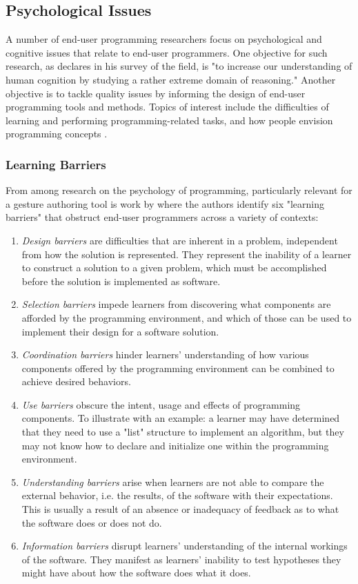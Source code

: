 \subsection{Psychological Issues}

A number of end-user programming researchers focus on psychological and cognitive issues that relate to end-user programmers. One objective for such research, as \textcite{Blackwell:2006} declares in his survey of the field, is "to increase our understanding of human cognition by studying a rather extreme domain of reasoning." Another objective is to tackle quality issues by informing the design of end-user programming tools and methods. Topics of interest include the difficulties of learning \parencite{Ko:2004, Pea:1987} and performing \parencite{Lewis:1987} programming-related tasks, and how people envision programming concepts \parencite{Pane:2001}.

\subsubsection{Learning Barriers}

From among research on the psychology of programming, particularly relevant for a gesture authoring tool is work by \textcite{Ko:2004} where the authors identify six "learning barriers" that obstruct end-user programmers across a variety of contexts:

\begin{enumerate}
\item \emph{Design barriers} are difficulties that are inherent in a problem, independent from how the solution is represented. They represent the inability of a learner to construct a solution to a given problem, which must be accomplished before the solution is implemented as software.
\item \emph{Selection barriers} impede learners from discovering what components are afforded by the programming environment, and which of those can be used to implement their design for a software solution.
\item \emph{Coordination barriers} hinder learners' understanding of how various components offered by the programming environment can be combined to achieve desired behaviors.
\item \emph{Use barriers} obscure the intent, usage and effects of programming components. To illustrate with an example: a learner may have determined that they need to use a "list" structure to implement an algorithm, but they may not know how to declare and initialize one within the programming environment.
\item \emph{Understanding barriers} arise when learners are not able to compare the external behavior, i.e. the results, of the software with their expectations. This is usually a result of an absence or inadequacy of feedback as to what the software does or does not do.
\item \emph{Information barriers} disrupt learners' understanding of the internal workings of the software. They manifest as learners' inability to test hypotheses they might have about how the software does what it does.
\end{enumerate}

